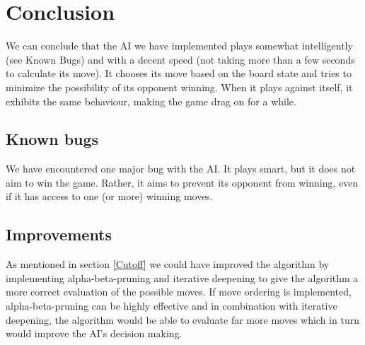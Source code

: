 \section{Conclusion}
\label{Conclusion}
We can conclude that the AI we have implemented plays somewhat intelligently (see Known Bugs) and with a decent speed (not taking more than a few seconds to calculate its move). It chooses its move based on the board state and tries to minimize the possibility of its opponent winning. When it plays against itself, it exhibits the same behaviour, making the game drag on for a while.

\subsection{Known bugs}
We have encountered one major bug with the AI. It plays smart, but it does not aim to win the game. Rather, it aims to prevent its opponent from winning, even if it has access to one (or more) winning moves. 

\subsection{Improvements}
As mentioned in section \ref{Cutoff} we could have improved the algorithm by implementing alpha-beta-pruning and iterative deepening to give the algorithm a more correct evaluation of the possible moves. If move ordering is implemented, alpha-beta-pruning can be highly effective and in combination with iterative deepening, the algorithm would be able to evaluate far more moves which in turn would improve the AI's decision making.